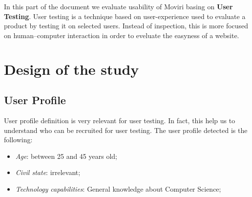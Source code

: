 In this part of the document we evaluate usability of Moviri basing on \textbf{User Testing}. User testing is a technique based on user-experience used to evaluate a product by testing it on selected users. Instead of inspection, this is more focused on human–computer interaction in order to eveluate the easyness of a website.

\section{Design of the study}
\subsection{User Profile}
User profile definition is very relevant for user testing. In fact, this help us to understand who can be recruited for user testing. The user profile detected is the following:
\begin{itemize}
\item \textit{Age}: between 25 and 45 years old;
\item \textit{Civil state}: irrelevant;
\item \textit{Technology capabilities}: General knowledge about Computer Science;
\end{itemize}

